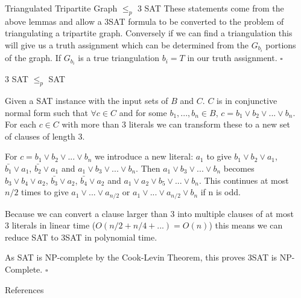 \documentclass[final]{beamer}
\newlength{\sepwidth}
\newlength{\colwidth}
\newcounter{col}
\newcommand{\separatorcolumn}{\begin{column}{\sepwidth}\end{column}}
\begin{document}
\begin{frame}[t]
\begin{columns}[t]
\begin{column}{\colwidth}
\begin{block}{Triangulated Tripartite Graph $\leq_p$ 3 SAT}
These statements come from the above lemmas and allow a 3SAT formula to be converted to the problem of triangulating a tripartite graph. Conversely if we can find a triangulation this will give us a truth assignment which can be determined from the $G_{b_i}$ portions of the graph. If $G_{b_i}$ is a true triangulation $b_i = T$ in our truth assignment. $\square$
  \end{block}
  \begin{block}{3 SAT $\leq_p$  SAT}

Given a SAT instance with the input sets of $B$ and $C$. $C$ is in conjunctive normal form such that $\forall c \in C$ and for some $b_1, ... ,b_n \in B$, $c = b_1 \lor b_2 \lor ... \lor b_n$. For each $c \in C$ with more than 3 literals we can transform these to a new set of clauses of length 3. 

For $c = b_1 \lor b_2 \lor ... \lor b_n$ we introduce a new literal: $a_1$ to give $b_1 \lor b_2 \lor a_1$, $\bar{b_1} \lor a_1$, $\bar{b_2} \lor a_1$ and $a_1 \lor b_3 \lor ... \lor b_n$. Then $a_1 \lor b_3 \lor ... \lor b_n$ becomes $b_3 \lor b_4 \lor a_2$, $\bar{b_3} \lor a_2$, $\bar{b_4} \lor a_2$ and $a_1 \lor a_2 \lor b_5 \lor ... \lor b_n$. This continues at most $n/2$ times to give $a_1 \lor ... \lor a_{n/2}$ or $a_1 \lor ... \lor a_{n/2} \lor b_n$ if n is odd. 

Because we can convert a clause larger than 3 into multiple clauses of at most 3 literals in linear time ($O(n/2 + n/4 + ...) = O(n)$) this means we can reduce SAT to 3SAT in polynomial time. 

As SAT is NP-complete by the Cook-Levin Theorem, this proves 3SAT is NP-Complete. $\square$

  \end{block}

  \begin{block}{References}
    \nocite{*}
    \footnotesize{}
  \end{block}
\end{column}

\separatorcolumn
\end{columns}
\end{frame}
\end{document}
